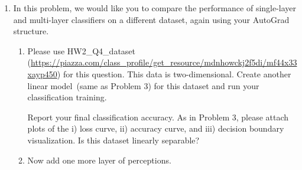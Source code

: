 \documentclass[a4paper]{article}
\begin{document}
\begin{enumerate}
Write a Python program based on your AutoGrad structure that iteratively computes a small step in the direction of the negative gradient. The dataset (HW2\_Q3\_dataset) can be downloaded from \url{https://piazza.com/class_profile/get_resource/mdnhowckj2f5di/mf44x67wv1r47b}. 
{\bf Please go through the README.txt carefully before you start.}
Initialize your optimization with all elements of $W$ being small random numbers and $b=0$. As shown in the visualization of the data provided in the link above, you can reasonably expect to see your algorithm converge to a solution that linearly separates the given data samples.\\

\begin{enumerate}
	\item Please plot the following and attach them in the report:
	\begin{enumerate}
		\item Cross Entropy loss with respect to training iterations~(loss curve) 
		\item Training accuracy with respect to training iterations~(accuracy curve)
		\item Visualization of the ground truth labels and your model's decision boundaries~(decision boundary visualization)
	\end{enumerate}
	\item Report your final classification accuracy. Briefly discuss your result based on the visualization of data distribution.
\end{enumerate}

\item	In this problem, we would like you to compare the performance of single-layer and multi-layer classifiers on a different dataset, again using your AutoGrad structure.
	\begin{enumerate}
		\item Please use HW2\_Q4\_dataset (\url{https://piazza.com/class_profile/get_resource/mdnhowckj2f5di/mf44x33xayp450}) for this question. This data is two-dimensional. Create another linear model~(same as Problem 3) for this dataset and run your classification training. 
		
		Report your final classification accuracy. As in Problem 3, please attach plots of the i) loss curve, ii) accuracy curve, and iii) decision boundary visualization. Is this dataset linearly separable?
		
\item Now add one more layer of perceptions.
  

\end{enumerate}
\end{enumerate}
\end{document}
